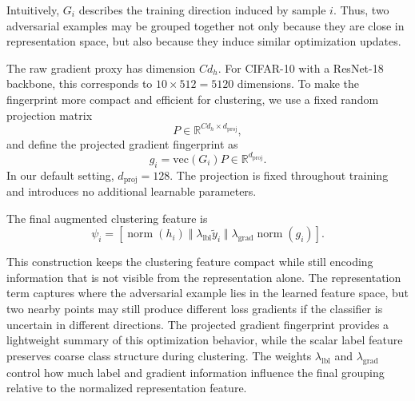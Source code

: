 Intuitively, \(G_i\) describes the training direction induced by sample \(i\).
Thus, two adversarial examples may be grouped together not only because they are
close in representation space, but also because they induce similar optimization
updates.

The raw gradient proxy has dimension \(C d_h\). For CIFAR-10 with a ResNet-18
backbone, this corresponds to \(10 \times 512 = 5120\) dimensions. To make the
fingerprint more compact and efficient for clustering, we use a fixed random
projection matrix
\[
P \in \mathbb{R}^{C d_h \times d_{\mathrm{proj}}},
\]
and define the projected gradient fingerprint as
\[
g_i = \mathrm{vec}(G_i)P
\in \mathbb{R}^{d_{\mathrm{proj}}}.
\]
In our default setting, \(d_{\mathrm{proj}}=128\). The projection is fixed throughout
training and introduces no additional learnable parameters.

The final augmented clustering feature is
\[
\psi_i =
\left[
\operatorname{norm}(h_i)
\;\Vert\;
\lambda_{\mathrm{lbl}}\tilde{y}_i
\;\Vert\;
\lambda_{\mathrm{grad}}\operatorname{norm}(g_i)
\right].
\]

This construction keeps the clustering feature compact while still encoding information
that is not visible from the representation alone. The representation term captures where
the adversarial example lies in the learned feature space, but two nearby points may still
produce different loss gradients if the classifier is uncertain in different directions. The
projected gradient fingerprint provides a lightweight summary of this optimization
behavior, while the scalar label feature preserves coarse class structure during clustering.
The weights \(\lambda_{\mathrm{lbl}}\) and \(\lambda_{\mathrm{grad}}\) control how much label
and gradient information influence the final grouping relative to the normalized
representation feature.

